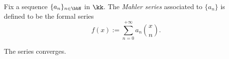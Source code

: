     \begin{definition}\label{def:Mahler_series}
        Fix a sequence \(\{a_n\}_{n \in \bbN}\) in \(\kk\).
        The \emph{Mahler series} associated to \(\{a_n\}\) is defined to be the formal series
        \[ f(x) := \sum_{n=0}^{+\infty} a_n \binom{x}{n}. \]
    \end{definition}

    \begin{proposition}\label{prop:convergence_of_Mahler_sequence}
        
    \end{proposition}

    \begin{theorem}\label{thm:analyticity_of_Mahler_series}
        The series converges.
    \end{theorem}
